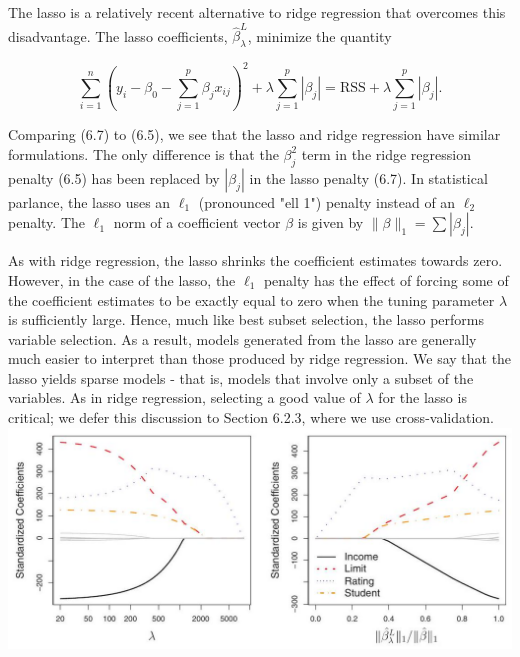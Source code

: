 \documentclass[10pt]{article}
\begin{document}
The lasso is a relatively recent alternative to ridge regression that overcomes this disadvantage. The lasso coefficients, $\hat{\beta}_{\lambda}^{L}$, minimize the quantity


\begin{equation*}
\sum_{i=1}^{n}\left(y_{i}-\beta_{0}-\sum_{j=1}^{p} \beta_{j} x_{i j}\right)^{2}+\lambda \sum_{j=1}^{p}\left|\beta_{j}\right|=\mathrm{RSS}+\lambda \sum_{j=1}^{p}\left|\beta_{j}\right| . \tag{6.7}
\end{equation*}


Comparing (6.7) to (6.5), we see that the lasso and ridge regression have similar formulations. The only difference is that the $\beta_{j}^{2}$ term in the ridge regression penalty (6.5) has been replaced by $\left|\beta_{j}\right|$ in the lasso penalty (6.7). In statistical parlance, the lasso uses an $\ell_{1}$ (pronounced "ell 1") penalty instead of an $\ell_{2}$ penalty. The $\ell_{1}$ norm of a coefficient vector $\beta$ is given by $\|\beta\|_{1}=\sum\left|\beta_{j}\right|$.

As with ridge regression, the lasso shrinks the coefficient estimates towards zero. However, in the case of the lasso, the $\ell_{1}$ penalty has the effect of forcing some of the coefficient estimates to be exactly equal to zero when the tuning parameter $\lambda$ is sufficiently large. Hence, much like best subset selection, the lasso performs variable selection. As a result, models generated from the lasso are generally much easier to interpret than those produced by ridge regression. We say that the lasso yields sparse models - that is, models that involve only a subset of the variables. As in ridge regression, selecting a good value of $\lambda$ for the lasso is critical; we defer this discussion to Section 6.2.3, where we use cross-validation.\\
\includegraphics[max width=\textwidth, center]{2025_05_05_efe77898333945044de4g-235}
\end{document}
